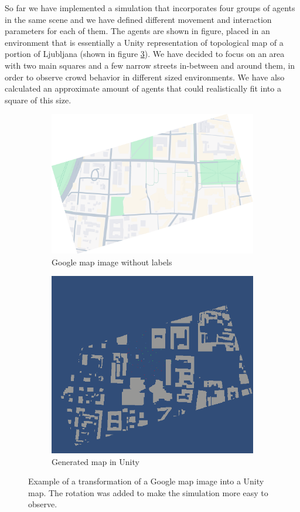 \documentclass[9pt]{pnas-new}
\begin{document}
So far we have implemented a simulation that incorporates four groups of agents in the same scene and we have defined different movement and interaction parameters for each of them. The agents are shown in figure, placed in an environment that is essentially a Unity representation of topological map of a portion of Ljubljana (shown in figure \ref{fig2}). We have decided to focus on an area with two main squares and a few narrow streets in-between and around them, in order to observe crowd behavior in different sized environments. We have also calculated an approximate amount of agents that could realistically fit into a square of this size. 


\begin{figure}[H]
\centering
\begin{subfigure}{.5\textwidth}
  \centering
  \includegraphics[width=0.95\columnwidth]{finalmap_rotated.png}
  \caption{Google map image without labels}
  \label{fig:sub1}
\end{subfigure}%
\begin{subfigure}{.5\textwidth}
  \centering
  \includegraphics[width=0.95\columnwidth]{fullmap.png}
  \caption{Generated map in Unity}
  \label{fig:sub2}
\end{subfigure}
\caption{Example of a transformation of a Google map image into a Unity map. The rotation was added to make the simulation more easy to observe. }
\label{fig2}
\end{figure}
\end{document}
